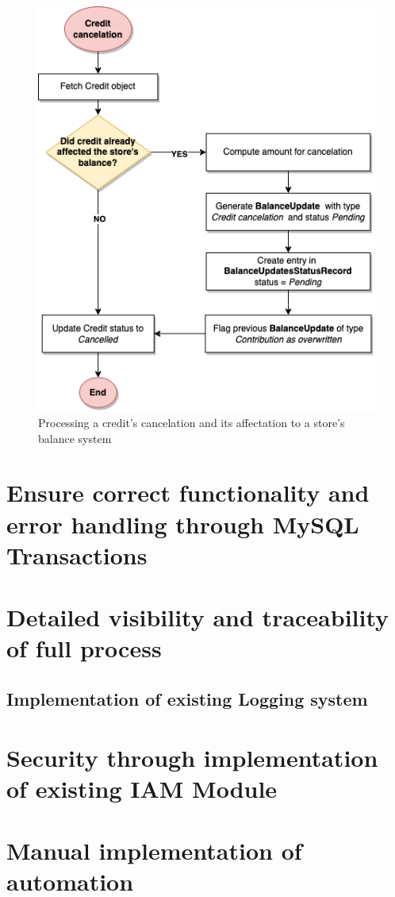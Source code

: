\begin{figure} [h]
    \centering
    \includegraphics[scale = 0.7]{assets/flowcharts/CreditCancelation.png}
    \caption{Processing a credit's cancelation and its affectation to a store's balance system}\label{fig:dlowchart_credit_cancelation}
\end{figure}

\section{Ensure correct functionality and error handling through MySQL Transactions}

\section{Detailed visibility and traceability of full process}

\subsection{Implementation of existing Logging system}

\section{Security through implementation of existing IAM Module}

\section{Manual implementation of automation}
